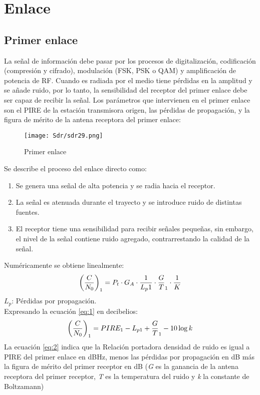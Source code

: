 \documentclass[
	12pt, %
	fleqn, %
	a4paper, %
	oneside, %
]{LegrandOrangeBook}
\begin{document}
\section{Enlace}
\subsection{Primer enlace}
La señal de información debe pasar por los procesos de digitalización,
codificación (compresión y cifrado), modulación (FSK, PSK o QAM) y
amplificación de potencia de RF. Cuando es radiada por el medio tiene pérdidas
en la amplitud y se añade ruido, por lo tanto, la sensibilidad del receptor del
primer enlace debe ser capaz de recibir la señal.
Los parámetros que intervienen en el primer enlace son el PIRE de la estación
transmisora origen, las pérdidas de propagación, y la figura de mérito de la
antena receptora del primer enlace:
\begin{figure}[H]
\centering
\texttt{[image: Sdr/sdr29.png]}
\caption{Primer enlace}
\end{figure}
Se describe el proceso del enlace directo como:
\begin{enumerate}
\item Se genera una señal de alta potencia y se radia hacia el receptor.
\item La señal es atenuada durante el trayecto y se introduce ruido de distintas fuentes.
\item El receptor tiene una sensibilidad para recibir señales pequeñas, sin embargo, el nivel de la señal contiene ruido agregado, contrarrestando la calidad de la señal.
\end{enumerate}
Numéricamente se obtiene linealmente:
\begin{equation}
\left(\frac{C}{N_0}\right)_1=P_t\cdot G_A\cdot\frac{1}{L_p1}\cdot\frac{G}{T}_{1}\cdot\frac{1}{K}
\label{eq:1}
\end{equation}
$L_p$: Pérdidas por propagación.\\
Expresando la ecuación \ref{eq:1} en decibelios:
\begin{equation}
\left(\frac{C}{N_0}\right)_1=PIRE_1-L_{p1}+\frac{G}{T}_1-10\log k
\label{eq:2}
\end{equation}
La ecuación \ref{eq:2} indica que la Relación portadora densidad de ruido es igual a PIRE del primer enlace en dBHz, menos las pérdidas por propagación en dB más la figura de mérito del primer receptor en dB (\textit{G} es la ganancia de la antena receptora del primer receptor, \textit{T} es la temperatura del ruido y \textit{k} la constante de Boltzamann)\\
\end{document}
